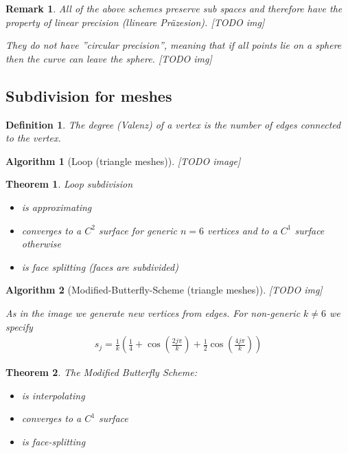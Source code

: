 \documentclass[]{article}
\newtheorem{theorem}{Theorem}
\newtheorem{definition}{Definition}
\newtheorem{algorithm}{Algorithm}
\newtheorem{remark}{Remark}
\begin{document}
\begin{remark}
	All of the above schemes preserve sub spaces and therefore have the property of linear precision (llineare Präzesion). [TODO img]
	
	They do not have ''circular precision'', meaning that if all points lie on a sphere then the curve can leave the sphere. [TODO img]
\end{remark}

\subsection{Subdivision for meshes}

\begin{definition}
	The degree (Valenz) of a vertex is the number of edges connected to the vertex.
\end{definition}

\begin{algorithm}[Loop (triangle meshes)]
	[TODO image]
\end{algorithm}

\begin{theorem}
	Loop subdivision
	\begin{itemize}
		\item is approximating
		\item converges to a $C^2$ surface for generic $n=6$ vertices and to a $C^1$ surface otherwise
		\item is face splitting (faces are subdivided)
	\end{itemize}
\end{theorem}

\begin{algorithm}[Modified-Butterfly-Scheme (triangle meshes)]
	[TODO img]
	
	As in the image we generate new vertices from edges. For non-generic $k \not= 6$ we specify
	\begin{align*}
		s_j = \frac{1}{k} \left(\frac{1}{4} + \cos\left(\frac{2j\pi}{k}\right) + \frac{1}{2}\cos\left(\frac{4j\pi}{k}\right) \right)
	\end{align*}
\end{algorithm}

\begin{theorem}
	The Modified Butterfly Scheme:
	\begin{itemize}
		\item is interpolating
		\item converges to a $C^1$ surface
		\item is face-splitting
	\end{itemize}
\end{theorem}
\end{document}

